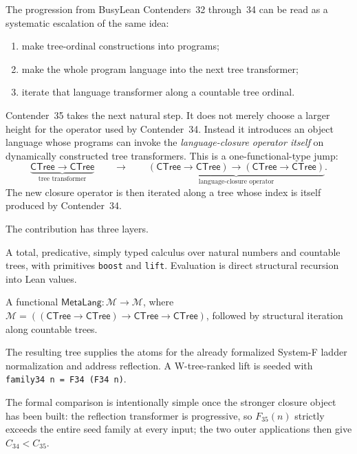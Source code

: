 \documentclass[11pt]{article}
\theoremstyle{definition}
\newcommand{\CTree}{\mathsf{CTree}}
\newcommand{\MOp}{\mathcal{M}}
\newcommand{\MetaLang}{\mathsf{MetaLang}}
\newcommand{\code}[1]{\texttt{#1}}
\begin{document}
The progression from BusyLean Contenders~32 through~34 can be read as a
systematic escalation of the same idea:
\begin{enumerate}[label=\arabic*.,leftmargin=2.2em]
  \item make tree-ordinal constructions into programs;
  \item make the whole program language into the next tree transformer;
  \item iterate that language transformer along a countable tree ordinal.
\end{enumerate}
Contender~35 takes the next natural step.  It does not merely choose a larger
height for the operator used by Contender~34.  Instead it introduces an object
language whose programs can invoke the \emph{language-closure operator itself}
on dynamically constructed tree transformers.  This is a one-functional-type
jump:
\[
  \underbrace{\CTree\to\CTree}_{\text{tree transformer}}
  \qquad\longrightarrow\qquad
  \underbrace{(\CTree\to\CTree)\to(\CTree\to\CTree)}_{
    \text{language-closure operator}}.
\]
The new closure operator is then iterated along a tree whose index is itself
produced by Contender~34.

The contribution has three layers.
\begin{description}[leftmargin=3.2cm,style=nextline]
  \item[Typed metalanguage.] A total, predicative, simply typed calculus over
  natural numbers and countable trees, with primitives \code{boost} and
  \code{lift}.  Evaluation is direct structural recursion into Lean values.

  \item[Transfinite closure.] A functional
  \(\MetaLang : \MOp\to\MOp\), where
  \(\MOp=((\CTree\to\CTree)\to\CTree\to\CTree)\), followed by structural
  iteration along countable trees.

  \item[Numeric reflection.] The resulting tree supplies the atoms for the
  already formalized System-F ladder normalization and address reflection.  A
  W-tree-ranked lift is seeded with \code{family34 n = F34 (F34 n)}.
\end{description}

The formal comparison is intentionally simple once the stronger closure object
has been built: the reflection transformer is progressive, so \(F_{35}(n)\)
strictly exceeds the entire seed family at every input; the two outer
applications then give \(C_{34}<C_{35}\).
\end{document}
